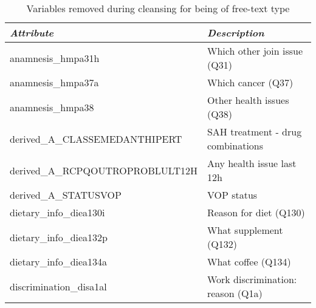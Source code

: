 
\begin{table}[h]
    \renewcommand{\arraystretch}{1} %
    \caption{Variables removed during cleansing for being of free-text type}
    \begin{center}
        \begin{tabular}{l|l}
            \textit{Attribute}               & \textit{Description}                      \\
            \hline
            \hline
            anamnesis\_hmpa31h               & Which other join issue (Q31)              \\
            anamnesis\_hmpa37a               & Which cancer (Q37)                        \\
            anamnesis\_hmpa38                & Other health issues (Q38)                 \\
            derived\_A\_CLASSEMEDANTHIPERT   & SAH treatment - drug combinations         \\
            derived\_A\_RCPQOUTROPROBLULT12H & Any health issue last 12h                 \\
            derived\_A\_STATUSVOP            & VOP status                                \\
            dietary\_info\_diea130i          & Reason for diet (Q130)                    \\
            dietary\_info\_diea132p          & What supplement (Q132)                    \\
            dietary\_info\_diea134a          & What coffee (Q134)                        \\
            discrimination\_disa1al          & Work discrimination: reason (Q1a)         \\

\end{tabular}
\end{center}
\end{table}
